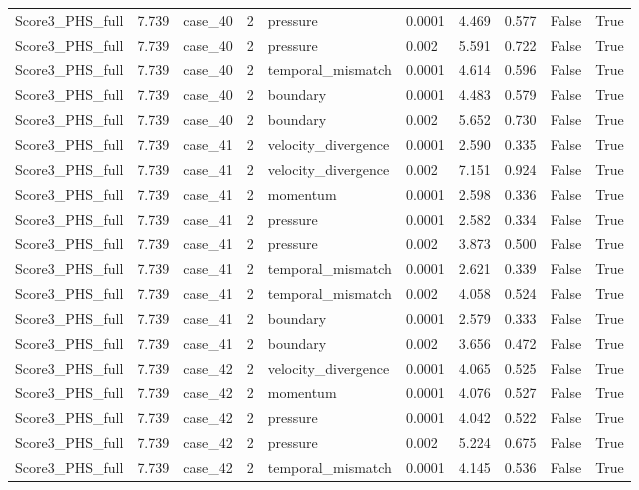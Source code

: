 \begin{longtable}{llllllllll}
Score3\_PHS\_full & 7.739 & case\_40 & 2 & pressure & 0.0001 & 4.469 & 0.577 & False & True \\
Score3\_PHS\_full & 7.739 & case\_40 & 2 & pressure & 0.002 & 5.591 & 0.722 & False & True \\
Score3\_PHS\_full & 7.739 & case\_40 & 2 & temporal\_mismatch & 0.0001 & 4.614 & 0.596 & False & True \\
Score3\_PHS\_full & 7.739 & case\_40 & 2 & boundary & 0.0001 & 4.483 & 0.579 & False & True \\
Score3\_PHS\_full & 7.739 & case\_40 & 2 & boundary & 0.002 & 5.652 & 0.730 & False & True \\
Score3\_PHS\_full & 7.739 & case\_41 & 2 & velocity\_divergence & 0.0001 & 2.590 & 0.335 & False & True \\
Score3\_PHS\_full & 7.739 & case\_41 & 2 & velocity\_divergence & 0.002 & 7.151 & 0.924 & False & True \\
Score3\_PHS\_full & 7.739 & case\_41 & 2 & momentum & 0.0001 & 2.598 & 0.336 & False & True \\
Score3\_PHS\_full & 7.739 & case\_41 & 2 & pressure & 0.0001 & 2.582 & 0.334 & False & True \\
Score3\_PHS\_full & 7.739 & case\_41 & 2 & pressure & 0.002 & 3.873 & 0.500 & False & True \\
Score3\_PHS\_full & 7.739 & case\_41 & 2 & temporal\_mismatch & 0.0001 & 2.621 & 0.339 & False & True \\
Score3\_PHS\_full & 7.739 & case\_41 & 2 & temporal\_mismatch & 0.002 & 4.058 & 0.524 & False & True \\
Score3\_PHS\_full & 7.739 & case\_41 & 2 & boundary & 0.0001 & 2.579 & 0.333 & False & True \\
Score3\_PHS\_full & 7.739 & case\_41 & 2 & boundary & 0.002 & 3.656 & 0.472 & False & True \\
Score3\_PHS\_full & 7.739 & case\_42 & 2 & velocity\_divergence & 0.0001 & 4.065 & 0.525 & False & True \\
Score3\_PHS\_full & 7.739 & case\_42 & 2 & momentum & 0.0001 & 4.076 & 0.527 & False & True \\
Score3\_PHS\_full & 7.739 & case\_42 & 2 & pressure & 0.0001 & 4.042 & 0.522 & False & True \\
Score3\_PHS\_full & 7.739 & case\_42 & 2 & pressure & 0.002 & 5.224 & 0.675 & False & True \\
Score3\_PHS\_full & 7.739 & case\_42 & 2 & temporal\_mismatch & 0.0001 & 4.145 & 0.536 & False & True \\

\end{longtable}
